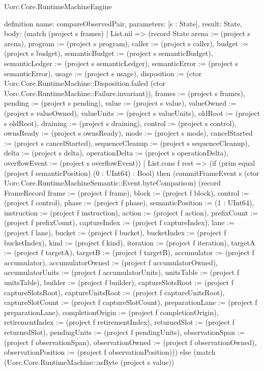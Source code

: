 \begin{lexlean}{Uorc.Core.RuntimeMachineEngine}
\begin{semanticmodule}
definition{
  name: compareObservedPair,
  parameters: [s : State],
  result: State,
  body: (match (project s frames)
    | List.nil => (record State {arena := (project s arena), program := (project s program), caller := (project s caller), budget := (project s budget), semanticBudget := (project s semanticBudget), semanticLedger := (project s semanticLedger), semanticError := (project s semanticError), usage := (project s usage), disposition := (ctor Uorc.Core.RuntimeMachine::Disposition.failed (ctor Uorc.Core.RuntimeMachine::Failure.invariant)), frames := (project s frames), pending := (project s pending), value := (project s value), valueOwned := (project s valueOwned), valueUnits := (project s valueUnits), oldRoot := (project s oldRoot), draining := (project s draining), control := (project s control), ownsReady := (project s ownsReady), mode := (project s mode), cancelStarted := (project s cancelStarted), sequenceCleanup := (project s sequenceCleanup), delta := (project s delta), operationDelta := (project s operationDelta), overflowEvent := (project s overflowEvent)})
    | List.cons f rest => (if (prim equal (project f semanticPosition) (0 : UInt64) : Bool) then (commitFrameEvent s (ctor Uorc.Core.RuntimeMachineSemantic::Event.byteComparison) (record FrameRecord {frame := (project f frame), block := (project f block), control := (project f control), phase := (project f phase), semanticPosition := (1 : UInt64), instruction := (project f instruction), action := (project f action), prefixCount := (project f prefixCount), captureIndex := (project f captureIndex), lane := (project f lane), bucket := (project f bucket), bucketIndex := (project f bucketIndex), kind := (project f kind), iteration := (project f iteration), targetA := (project f targetA), targetB := (project f targetB), accumulator := (project f accumulator), accumulatorOwned := (project f accumulatorOwned), accumulatorUnits := (project f accumulatorUnits), unitsTable := (project f unitsTable), builder := (project f builder), captureSlotsRoot := (project f captureSlotsRoot), captureUnitsRoot := (project f captureUnitsRoot), captureSlotCount := (project f captureSlotCount), preparationLane := (project f preparationLane), completionOrigin := (project f completionOrigin), retirementIndex := (project f retirementIndex), returnedSlot := (project f returnedSlot), pendingUnits := (project f pendingUnits), observationSpan := (project f observationSpan), observationOwned := (project f observationOwned), observationPosition := (project f observationPosition)})) else (match (Uorc.Core.RuntimeMachine::asByte (project s value))
}
\end{semanticmodule}
\end{lexlean}
